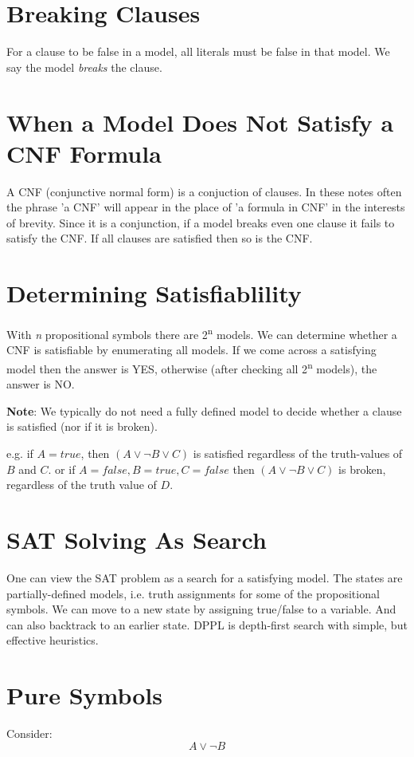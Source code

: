 \documentclass[11pt]{article}
\begin{document}
\section{Breaking Clauses}
\label{sec:org30da39f}
For a clause to be false in a model, all literals must be false in that model.
We say the model \emph{breaks} the clause.

\section{When a Model Does Not Satisfy a CNF Formula}
\label{sec:org207bb29}
A CNF (conjunctive normal form) is a conjuction of clauses.
In these notes often the phrase 'a CNF' will appear in the place of 'a formula in CNF' in the interests of brevity.
Since it is a conjunction, if a model breaks even one clause it fails to satisfy the CNF.
If all clauses are satisfied then so is the CNF.

\section{Determining Satisfiablility}
\label{sec:orgc4e5938}
With \emph{n} propositional symbols there are 2\textsuperscript{n} models.
We can determine whether a CNF is satisfiable by enumerating all models.
If we come across a satisfying model then the answer is YES, otherwise (after checking all 2\textsuperscript{n} models), the answer is NO.

\textbf{Note}: We typically do not need a fully defined model to decide whether a clause is satisfied (nor if it is broken).

e.g. if \(A = true\), then \((A \lor \neg B \lor C)\) is satisfied regardless of the truth-values of \(B\) and \(C\).
or if \(A = false, B = true, C = false\) then \((A \lor \neg B \lor C)\) is broken, regardless of the truth value of \(D\).

\section{SAT Solving As Search}
\label{sec:org17630c7}
One can view the SAT problem as a search for a satisfying model.
The states are partially-defined models, i.e. truth assignments for some of the propositional symbols.
We can move to a new state by assigning true/false to a variable.
And can also backtrack to an earlier state.
DPPL is depth-first search with simple, but effective heuristics.


\section{Pure Symbols}
\label{sec:org25af95f}
Consider:
\begin{equation}
A \lor \neg B
\end{equation}
\end{document}
